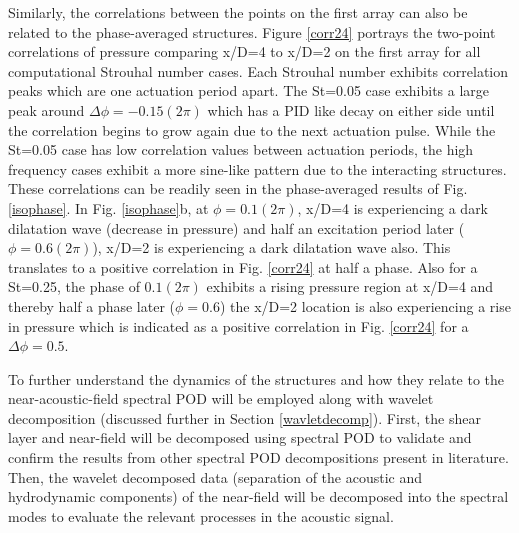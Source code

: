 \documentclass[english]{aiaa-tc}
\begin{document}
Similarly, the correlations between the points on the first array can also be related to the phase-averaged structures. Figure \ref{corr24} portrays the two-point correlations of pressure comparing x/D=4 to x/D=2 on the first array for all computational Strouhal number cases. Each Strouhal number exhibits correlation peaks which are one actuation period apart. The St=0.05 case exhibits a large peak around $\Delta \phi=-0.15(2\pi)$ which has a PID like decay on either side until the correlation begins to grow again due to the next actuation pulse. While the St=0.05 case has low correlation values between actuation periods, the high frequency cases exhibit a more sine-like pattern due to the interacting structures.  These correlations can be readily seen in the phase-averaged results of Fig. \ref{isophase}. In Fig. \ref{isophase}b, at $\phi=0.1(2\pi)$, x/D=4 is experiencing a dark dilatation wave (decrease in pressure) and half an excitation period later ($\phi=0.6(2\pi)$), x/D=2 is experiencing a dark dilatation wave also. This translates to a positive correlation in Fig. \ref{corr24} at half a phase. Also for a St=0.25, the phase of $0.1(2\pi)$ exhibits a rising pressure region at x/D=4 and thereby half a phase later ($\phi=0.6$) the x/D=2 location is also experiencing a rise in pressure which is indicated as a positive correlation in Fig. \ref{corr24} for a $\Delta \phi=0.5$.

To further understand the dynamics of the structures and how they relate to the near-acoustic-field spectral POD will be employed along with wavelet decomposition (discussed further in Section \ref{wavletdecomp}). First, the shear layer and near-field will be decomposed using spectral POD to validate and confirm the results from other spectral POD decompositions present in literature.\cite{jordan2007,Arndt1997,freund2002} Then, the wavelet decomposed data (separation of the acoustic and hydrodynamic components) of the near-field will be decomposed into the spectral modes to evaluate the relevant processes in the acoustic signal.
\end{document}
